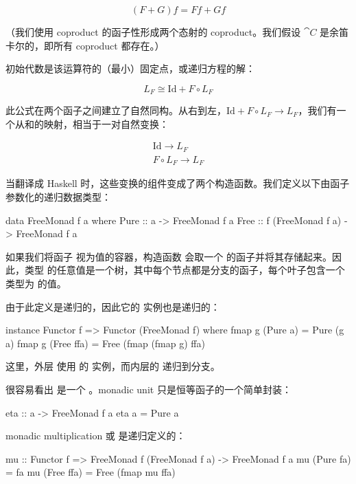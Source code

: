 \documentclass[DaoFP]{subfiles}
\begin{document}
    \[ (F + G) f = F f + G f \]

    （我们使用 coproduct 的函子性形成两个态射的 coproduct。我们假设 $\cat C$ 是余笛卡尔的，即所有 coproduct 都存在。）

    初始代数是该运算符的（最小）固定点，或递归方程的解：

    \[ L_F \cong \text{Id} + F \circ L_F \]

    此公式在两个函子之间建立了自然同构。从右到左，$\text{Id} + F \circ L_F \to L_F$，我们有一个从和的映射，相当于一对自然变换：

    \begin{align*}
        \text{Id} \to L_F
        \\
        F \circ L_F \to L_F
    \end{align*}

    当翻译成 Haskell 时，这些变换的组件变成了两个构造函数。我们定义以下由函子  参数化的递归数据类型：

    \begin{haskell}
        data FreeMonad f a where
        Pure :: a -> FreeMonad f a
        Free :: f (FreeMonad f a) -> FreeMonad f a
    \end{haskell}

    如果我们将函子  视为值的容器，构造函数  会取一个  的函子并将其存储起来。因此，类型  的任意值是一个树，其中每个节点都是分支的函子，每个叶子包含一个类型为  的值。

    由于此定义是递归的，因此它的  实例也是递归的：

    \begin{haskell}
        instance Functor f => Functor (FreeMonad f) where
        fmap g (Pure a) = Pure (g a)
        fmap g (Free ffa) = Free (fmap (fmap g) ffa)
    \end{haskell}

    这里，外层  使用  的  实例，而内层的  递归到分支。

    很容易看出  是一个 。monadic unit  只是恒等函子的一个简单封装：

    \begin{haskell}
        eta :: a -> FreeMonad f a
        eta a = Pure a
    \end{haskell}

    monadic multiplication 或  是递归定义的：

    \begin{haskell}
        mu :: Functor f => FreeMonad f (FreeMonad f a) -> FreeMonad f a
        mu (Pure fa) = fa
        mu (Free ffa) = Free (fmap mu ffa)
    \end{haskell}
\end{document}
